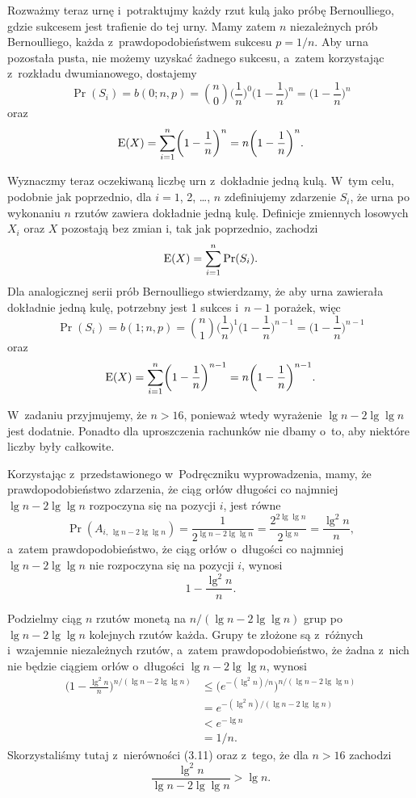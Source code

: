 Rozważmy teraz  urnę i~potraktujmy każdy rzut kulą jako próbę Bernoulliego, gdzie sukcesem jest trafienie do tej urny.
Mamy zatem $n$ niezależnych prób Bernoulliego, każda z~prawdopodobieństwem sukcesu $p=1/n$.
Aby  urna pozostała pusta, nie możemy uzyskać żadnego sukcesu, a~zatem korzystając z~rozkładu dwumianowego, dostajemy
\[
	\Pr(S_i) = b(0;n,p) = \binom{n}{0}\biggl(\frac{1}{n}\biggr)^0\biggl(1-\frac{1}{n}\biggr)^n = \biggl(1-\frac{1}{n}\biggr)^n
\]
oraz
\[
	\operatorname{E}(X) = \sum_{i=1}^n\biggl(1-\frac{1}{n}\biggr)^n = n\biggl(1-\frac{1}{n}\biggr)^n.
\]

Wyznaczmy teraz oczekiwaną liczbę urn z~dokładnie jedną kulą.
W~tym celu, podobnie jak poprzednio, dla $i=1$, 2, \dots, $n$ zdefiniujemy zdarzenie $S_i$, że  urna po wykonaniu $n$ rzutów zawiera dokładnie jedną kulę.
Definicje zmiennych losowych $X_i$ oraz $X$ pozostają bez zmian i, tak jak poprzednio, zachodzi
\[
	\operatorname{E}(X) = \sum_{i=1}^n\Pr(S_i).
\]
Dla analogicznej serii prób Bernoulliego stwierdzamy, że aby  urna zawierała dokładnie jedną kulę, potrzebny jest 1 sukces i~$n-1$ porażek, więc
\[
	\Pr(S_i) = b(1;n,p) = \binom{n}{1}\biggl(\frac{1}{n}\biggr)^1\biggl(1-\frac{1}{n}\biggr)^{n-1} = \biggl(1-\frac{1}{n}\biggr)^{n-1}
\]
oraz
\[
	\operatorname{E}(X) = \sum_{i=1}^n\biggl(1-\frac{1}{n}\biggr)^{n-1} = n\biggl(1-\frac{1}{n}\biggr)^{n-1}.
\]

\exercise %
W~zadaniu przyjmujemy, że $n>16$, ponieważ wtedy wyrażenie $\lg n-2\lg\lg n$ jest dodatnie.
Ponadto dla uproszczenia rachunków nie dbamy o~to, aby niektóre liczby były całkowite.

Korzystając z~przedstawionego w~Podręczniku wyprowadzenia, mamy, że prawdopodobieństwo zdarzenia, że ciąg orłów długości co najmniej $\lg n-2\lg\lg n$ rozpoczyna się na pozycji $i$, jest równe
\[
	\Pr(A_{i,\,\lg n-2\lg\lg n}) = \frac{1}{2^{\lg n-2\lg\lg n}} = \frac{2^{2\lg\lg n}}{2^{\lg n}} = \frac{\lg^2n}{n},
\]
a~zatem prawdopodobieństwo, że ciąg orłów o~długości co najmniej $\lg n-2\lg\lg n$ nie rozpoczyna się na pozycji $i$, wynosi
\[
	1-\frac{\lg^2n}{n}.
\]

Podzielmy ciąg $n$ rzutów monetą na $n/(\lg n-2\lg\lg n)$ grup po $\lg n-2\lg\lg n$ kolejnych rzutów każda.
Grupy te złożone są z~różnych i~wzajemnie niezależnych rzutów, a~zatem prawdopodobieństwo, że żadna z~nich nie będzie ciągiem orłów o~długości $\lg n-2\lg\lg n$, wynosi
\begin{align*}
	\biggl(1-\frac{\lg^2n}{n}\biggr)^{n/(\lg n-2\lg\lg n)} &\le \bigl(e^{-(\lg^2n)/n}\bigr)^{n/(\lg n-2\lg\lg n)} \\
	&= e^{-(\lg^2n)/(\lg n-2\lg\lg n)} \\
	&< e^{-\lg n} \\
	&= 1/n.
\end{align*}
Skorzystaliśmy tutaj z~nierówności (3.11) oraz z~tego, że dla $n>16$ zachodzi
\[
	\frac{\lg^2n}{\lg n-2\lg\lg n} > \lg n.
\]
